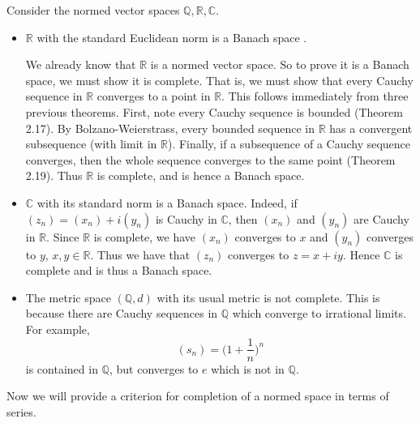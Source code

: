 \begin{example}
Consider the normed vector spaces $\mathbb{Q}, \mathbb{R}, \mathbb{C}$.
\begin{itemize}
\item $\mathbb{R}$ with the standard Euclidean norm is a Banach space \cite{nthubanach}. 

We already know that $\mathbb{R}$ is a normed vector space.  So to prove it is a Banach space, we must show it is complete.  That is, we must show that every Cauchy sequence in $\mathbb{R}$ converges to a point in $\mathbb{R}$.  This follows immediately from three previous theorems.  First, note every Cauchy sequence is bounded (Theorem 2.17).  By Bolzano-Weierstrass, every bounded sequence in $\mathbb{R}$ has a convergent subsequence (with limit in $\mathbb{R}$).  Finally, if a subsequence of a Cauchy sequence converges, then the whole sequence converges to the same point (Theorem 2.19).  Thus $\mathbb{R}$ is complete, and is hence a Banach space.

\item $\mathbb{C}$ with its standard norm is a Banach space.  Indeed, if $(z_n) = (x_n) + i(y_n)$ is Cauchy in $\mathbb{C}$, then $(x_n)$ and $(y_n)$ are Cauchy in $\mathbb{R}$.  Since $\mathbb{R}$ is complete, we have $(x_n)$ converges to $x$ and $(y_n)$ converges to $y$, $x, y \in \mathbb{R}$.  Thus we have that $(z_n)$ converges to $z = x + iy$.  Hence $\mathbb{C}$ is complete and is thus a Banach space.

\item The metric space $(\mathbb{Q}, d)$ with its usual metric is not complete.  This is because there are Cauchy sequences in $\mathbb{Q}$ which converge to irrational limits.  For example, 
\[(s_n) = \biggl ( 1 + \frac{1}{n} \biggr )^n\]
is contained in $\mathbb{Q}$, but converges to $e$ which is not in $\mathbb{Q}$.
\end{itemize}
\end{example}

Now we will provide a criterion for completion of a normed space in terms of series.

